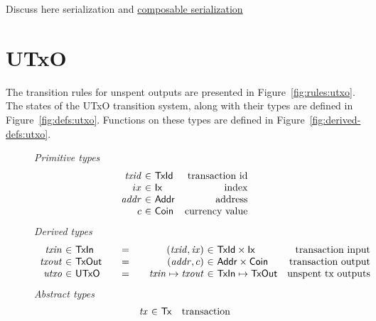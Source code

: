 \documentclass[11pt,a4paper]{article}
\newcommand{\Tx}{\type{Tx}}
\newcommand{\Ix}{\type{Ix}}
\newcommand{\TxId}{\type{TxId}}
\newcommand{\Addr}{\type{Addr}}
\newcommand{\UTxO}{\type{UTxO}}
\newcommand{\Coin}{\type{Coin}}
\newcommand{\TxIn}{\type{TxIn}}
\newcommand{\TxOut}{\type{TxOut}}
\begin{document}
\begin{todo}
  Discuss here serialization and
  \href{https://iohk.myjetbrains.com/youtrack/issue/CDEC-628}{composable
    serialization}
\end{todo}

\section{UTxO}
\label{sec:state-trans-utxo-1}

The transition rules for unspent outputs are presented in
Figure~\ref{fig:rules:utxo}. The states of the UTxO transition system,
along with their types are defined in Figure~\ref{fig:defs:utxo}.
Functions on these types are defined in Figure~\ref{fig:derived-defs:utxo}.

\begin{figure*}
  \emph{Primitive types}
  \begin{equation*}
    \begin{array}{r@{~\in~}lr}
      \var{txid} & \TxId & \text{transaction id}\\
      ix & \Ix & \text{index}\\
      \var{addr} & \Addr & \text{address}\\
      c & \Coin & \text{currency value}
    \end{array}
  \end{equation*}
  \emph{Derived types}
  \begin{equation*}
    \begin{array}{r@{~\in~}l@{\qquad=\qquad}r@{~\in~}lr}
      \var{txin}
      & \TxIn
      & (\var{txid}, \var{ix})
      & \TxId \times \Ix
      & \text{transaction input}
      \\
      \var{txout}
      & \type{TxOut}
      & (\var{addr}, c)
      & \Addr \times \Coin
      & \text{transaction output}
      \\
      \var{utxo}
      & \UTxO
      & \var{txin} \mapsto \var{txout}
      & \TxIn \mapsto \TxOut
      & \text{unspent tx outputs}
    \end{array}
  \end{equation*}
  \emph{Abstract types}
  \begin{equation*}
    \begin{array}{r@{~\in~}lr}
      \var{tx} & \Tx & \text{transaction}\\
    \end{array}
  \end{equation*}

\end{figure*}
\end{document}
